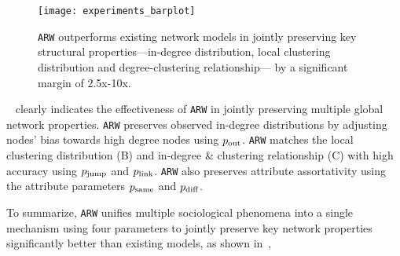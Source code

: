 \begin{figure}[b]
	\centering
	\texttt{[image: experiments\_barplot]}
		\caption{\texttt{ARW} outperforms
			existing network models in jointly preserving key structural properties---in-degree
			distribution, local clustering distribution and degree-clustering relationship---
			by a significant margin of 2.5x-10x.
		}
		\label{fig:barplot}
\end{figure}

~ clearly indicates the effectiveness
of \texttt{ARW} in {jointly} preserving multiple
global network properties. \texttt{ARW} preserves observed
in-degree distributions by adjusting nodes' bias towards high degree nodes
using $p_{\scriptsize\mbox{out}}$.
\texttt{ARW} matches the local clustering
distribution  (B) and in-degree \& clustering relationship
(C) with high accuracy using $p_{\scriptsize\mbox{jump}}$ and
$p_{\scriptsize\mbox{link}}$. \texttt{ARW} also preserves attribute assortativity using
the attribute parameters $p_{\scriptsize\mbox{same}}$ and $p_{\scriptsize\mbox{diff}}$.

To summarize, \texttt{ARW} unifies multiple sociological phenomena into a single
mechanism using four parameters to jointly preserve key network properties significantly
better than existing models, as shown in~,



